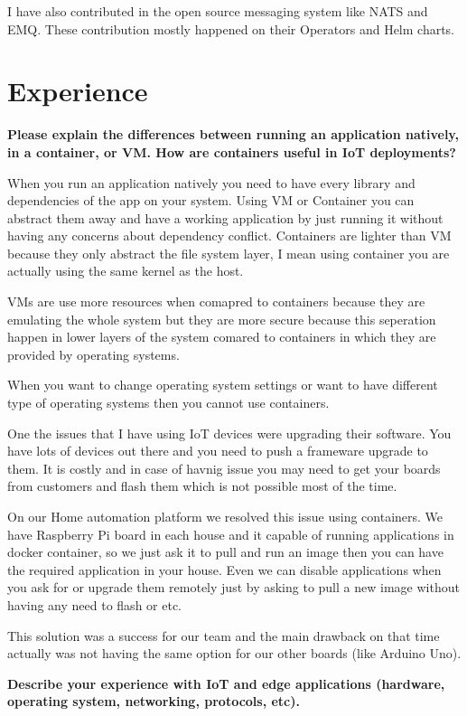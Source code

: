 I have also contributed in the open source messaging system like NATS and EMQ. These contribution mostly happened
on their Operators and Helm charts.

\section{Experience}

\textbf{Please explain the differences between running an application natively, in a container, or VM.
How are containers useful in IoT deployments?}

When you run an application natively you need to have every library and dependencies of the app on your system.
Using VM or Container you can abstract them away and have a working application by just running it without
having any concerns about dependency conflict.
Containers are lighter than VM because they only abstract the file system layer, I mean using container
you are actually using the same kernel as the host.

VMs are use more resources when comapred to containers because they are emulating the whole system but they are
more secure because this seperation happen in lower layers of the system comared to containers in which they
are provided by operating systems.

When you want to change operating system settings or want to have different type of operating systems then you cannot
use containers.

One the issues that I have using IoT devices were upgrading their software. You have lots of devices out there
and you need to push a frameware upgrade to them. It is costly and in case of havnig issue you may need to get
your boards from customers and flash them which is not possible most of the time.

On our Home automation platform we resolved this issue using containers. We have Raspberry Pi board in each house
and it capable of running applications in docker container, so we just ask it to pull and run an image then
you can have the required application in your house. Even we can disable applications when you ask for or upgrade
them remotely just by asking to pull a new image without having any need to flash or etc.

This solution was a success for our team and the main drawback on that time actually was not having the same
option for our other boards (like Arduino Uno).

\textbf{Describe your experience with IoT and edge applications (hardware, operating system, networking, protocols, etc).}

